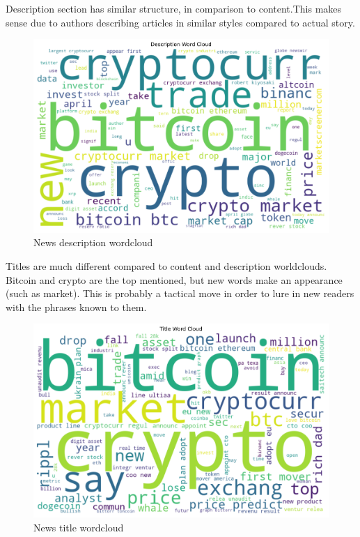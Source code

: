 Description section has similar structure, in comparison to content.This makes sense due to authors describing articles in similar styles compared to actual story.
\begin{figure}[H]
\includegraphics[scale=0.60]{img/B2/description_wordcloud.png}
\centering
\caption{News description wordcloud}
\label{fig:description_wordcloud}
\end{figure}

Titles are much different compared to content and description worldclouds. Bitcoin and crypto are the top mentioned, but new words make an appearance (such as market). This is probably a tactical move in order to lure in new readers with the phrases known to them.
\begin{figure}[H]
\includegraphics[scale=0.60]{img/B2/title_wordcloud.png}
\centering
\caption{News title wordcloud}
\label{fig:title_wordcloud}
\end{figure}

